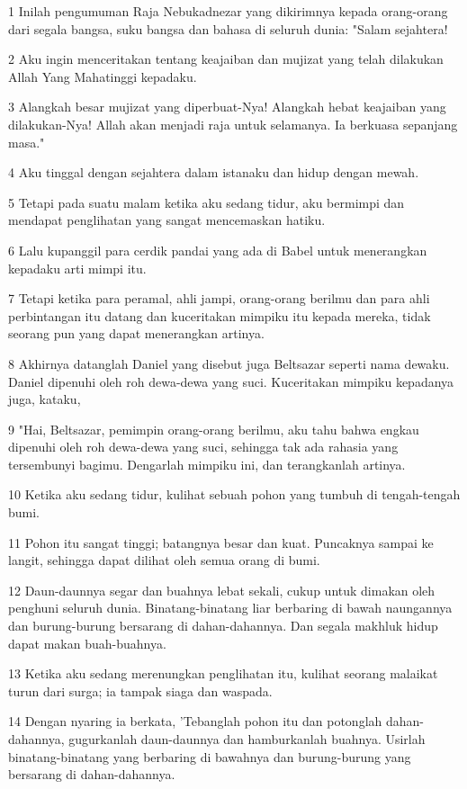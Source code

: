 \par 1 Inilah pengumuman Raja Nebukadnezar yang dikirimnya kepada orang-orang dari segala bangsa, suku bangsa dan bahasa di seluruh dunia: "Salam sejahtera!
\par 2 Aku ingin menceritakan tentang keajaiban dan mujizat yang telah dilakukan Allah Yang Mahatinggi kepadaku.
\par 3 Alangkah besar mujizat yang diperbuat-Nya! Alangkah hebat keajaiban yang dilakukan-Nya! Allah akan menjadi raja untuk selamanya. Ia berkuasa sepanjang masa."
\par 4 Aku tinggal dengan sejahtera dalam istanaku dan hidup dengan mewah.
\par 5 Tetapi pada suatu malam ketika aku sedang tidur, aku bermimpi dan mendapat penglihatan yang sangat mencemaskan hatiku.
\par 6 Lalu kupanggil para cerdik pandai yang ada di Babel untuk menerangkan kepadaku arti mimpi itu.
\par 7 Tetapi ketika para peramal, ahli jampi, orang-orang berilmu dan para ahli perbintangan itu datang dan kuceritakan mimpiku itu kepada mereka, tidak seorang pun yang dapat menerangkan artinya.
\par 8 Akhirnya datanglah Daniel yang disebut juga Beltsazar seperti nama dewaku. Daniel dipenuhi oleh roh dewa-dewa yang suci. Kuceritakan mimpiku kepadanya juga, kataku,
\par 9 "Hai, Beltsazar, pemimpin orang-orang berilmu, aku tahu bahwa engkau dipenuhi oleh roh dewa-dewa yang suci, sehingga tak ada rahasia yang tersembunyi bagimu. Dengarlah mimpiku ini, dan terangkanlah artinya.
\par 10 Ketika aku sedang tidur, kulihat sebuah pohon yang tumbuh di tengah-tengah bumi.
\par 11 Pohon itu sangat tinggi; batangnya besar dan kuat. Puncaknya sampai ke langit, sehingga dapat dilihat oleh semua orang di bumi.
\par 12 Daun-daunnya segar dan buahnya lebat sekali, cukup untuk dimakan oleh penghuni seluruh dunia. Binatang-binatang liar berbaring di bawah naungannya dan burung-burung bersarang di dahan-dahannya. Dan segala makhluk hidup dapat makan buah-buahnya.
\par 13 Ketika aku sedang merenungkan penglihatan itu, kulihat seorang malaikat turun dari surga; ia tampak siaga dan waspada.
\par 14 Dengan nyaring ia berkata, 'Tebanglah pohon itu dan potonglah dahan-dahannya, gugurkanlah daun-daunnya dan hamburkanlah buahnya. Usirlah binatang-binatang yang berbaring di bawahnya dan burung-burung yang bersarang di dahan-dahannya.
